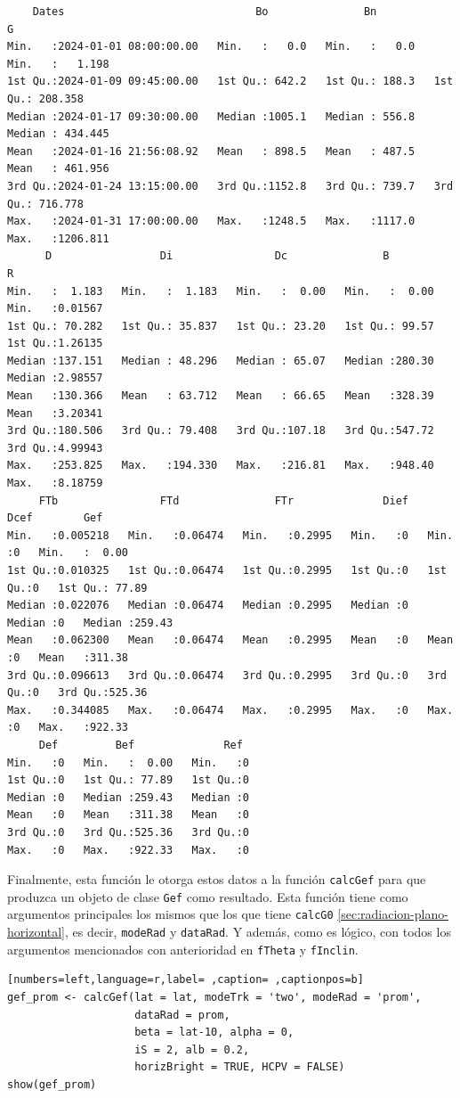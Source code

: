 \begin{itemize}
\begin{verbatim}
    Dates                              Bo               Bn               G           
Min.   :2024-01-01 08:00:00.00   Min.   :   0.0   Min.   :   0.0   Min.   :   1.198  
1st Qu.:2024-01-09 09:45:00.00   1st Qu.: 642.2   1st Qu.: 188.3   1st Qu.: 208.358  
Median :2024-01-17 09:30:00.00   Median :1005.1   Median : 556.8   Median : 434.445  
Mean   :2024-01-16 21:56:08.92   Mean   : 898.5   Mean   : 487.5   Mean   : 461.956  
3rd Qu.:2024-01-24 13:15:00.00   3rd Qu.:1152.8   3rd Qu.: 739.7   3rd Qu.: 716.778  
Max.   :2024-01-31 17:00:00.00   Max.   :1248.5   Max.   :1117.0   Max.   :1206.811  
      D                 Di                Dc               B                R          
Min.   :  1.183   Min.   :  1.183   Min.   :  0.00   Min.   :  0.00   Min.   :0.01567  
1st Qu.: 70.282   1st Qu.: 35.837   1st Qu.: 23.20   1st Qu.: 99.57   1st Qu.:1.26135  
Median :137.151   Median : 48.296   Median : 65.07   Median :280.30   Median :2.98557  
Mean   :130.366   Mean   : 63.712   Mean   : 66.65   Mean   :328.39   Mean   :3.20341  
3rd Qu.:180.506   3rd Qu.: 79.408   3rd Qu.:107.18   3rd Qu.:547.72   3rd Qu.:4.99943  
Max.   :253.825   Max.   :194.330   Max.   :216.81   Max.   :948.40   Max.   :8.18759  
     FTb                FTd               FTr              Dief        Dcef        Gef        
Min.   :0.005218   Min.   :0.06474   Min.   :0.2995   Min.   :0   Min.   :0   Min.   :  0.00  
1st Qu.:0.010325   1st Qu.:0.06474   1st Qu.:0.2995   1st Qu.:0   1st Qu.:0   1st Qu.: 77.89  
Median :0.022076   Median :0.06474   Median :0.2995   Median :0   Median :0   Median :259.43  
Mean   :0.062300   Mean   :0.06474   Mean   :0.2995   Mean   :0   Mean   :0   Mean   :311.38  
3rd Qu.:0.096613   3rd Qu.:0.06474   3rd Qu.:0.2995   3rd Qu.:0   3rd Qu.:0   3rd Qu.:525.36  
Max.   :0.344085   Max.   :0.06474   Max.   :0.2995   Max.   :0   Max.   :0   Max.   :922.33  
     Def         Bef              Ref   
Min.   :0   Min.   :  0.00   Min.   :0  
1st Qu.:0   1st Qu.: 77.89   1st Qu.:0  
Median :0   Median :259.43   Median :0  
Mean   :0   Mean   :311.38   Mean   :0  
3rd Qu.:0   3rd Qu.:525.36   3rd Qu.:0  
Max.   :0   Max.   :922.33   Max.   :0
\end{verbatim}
\end{itemize}

Finalmente, esta función le otorga estos datos a la función \texttt{calcGef} para que produzca un objeto de clase \texttt{Gef} como resultado. Esta función tiene como argumentos principales los mismos que los que tiene \texttt{calcG0} \ref{sec:radiacion-plano-horizontal}, es decir, \texttt{modeRad} y \texttt{dataRad}. Y además, como es lógico, con todos los argumentos mencionados con anterioridad en \texttt{fTheta} y \texttt{fInclin}.
\begin{lstlisting}[numbers=left,language=r,label= ,caption= ,captionpos=b]
gef_prom <- calcGef(lat = lat, modeTrk = 'two', modeRad = 'prom',
                    dataRad = prom,
                    beta = lat-10, alpha = 0,
                    iS = 2, alb = 0.2,
                    horizBright = TRUE, HCPV = FALSE)
show(gef_prom)
\end{lstlisting}


